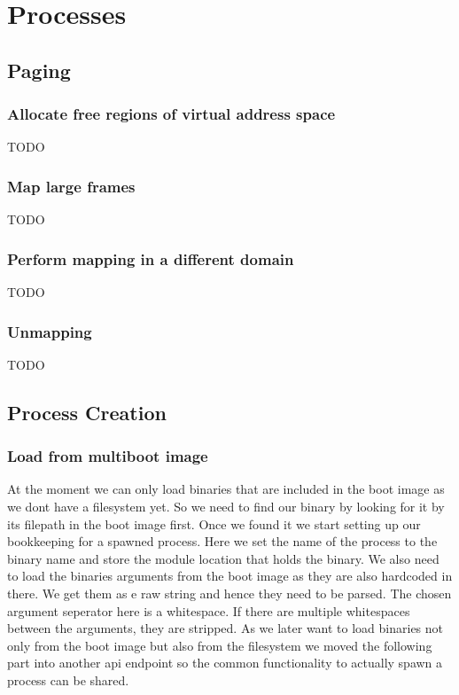 \section{Processes}

\subsection{Paging}

\subsubsection{Allocate free regions of virtual address space}
TODO

\subsubsection{Map large frames}
TODO

\subsubsection{Perform mapping in a different domain}
TODO

\subsubsection{Unmapping}
TODO

\subsection{Process Creation}

\subsubsection{Load from multiboot image}

At the moment we can only load binaries that are included in the boot image as we dont have a filesystem yet. So we need to find our binary by looking for it by its filepath in the boot image first.
Once we found it we start setting up our bookkeeping for a spawned process. Here we set the name of the process to the binary name and store the module location that holds the binary.
We also need to load the binaries arguments from the boot image as they are also hardcoded in there. We get them as e raw string and hence they need to be parsed. The chosen argument seperator here is a whitespace. If there are multiple whitespaces between the arguments, they are stripped.
As we later want to load binaries not only from the boot image but also from the filesystem we moved the following part into another api endpoint so the common functionality to actually spawn a process can be shared.

